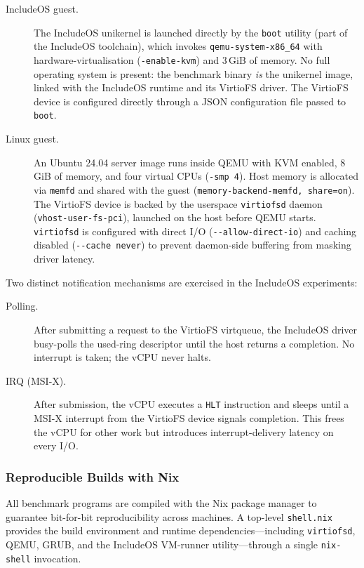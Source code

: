 \begin{description}
  \item[IncludeOS guest.]  The IncludeOS unikernel is launched directly
    by the \texttt{boot} utility (part of the IncludeOS toolchain), which
    invokes \texttt{qemu-system-x86\_64} with hardware-virtualisation
    (\texttt{-enable-kvm}) and 3\,GiB of memory.  No full operating
    system is present: the benchmark binary \emph{is} the unikernel image,
    linked with the IncludeOS runtime and its VirtioFS driver.  The
    VirtioFS device is configured directly through a JSON configuration
    file passed to \texttt{boot}.

  \item[Linux guest.]  An Ubuntu 24.04 server image runs inside QEMU with
    KVM enabled, 8\,GiB of memory, and four virtual CPUs (\texttt{-smp 4}).
    Host memory is allocated via \texttt{memfd} and shared with the guest
    (\texttt{memory-backend-memfd, share=on}).  The VirtioFS device is
    backed by the userspace \texttt{virtiofsd} daemon
    (\texttt{vhost-user-fs-pci}), launched on the host before QEMU starts.
    \texttt{virtiofsd} is configured with direct I/O
    (\texttt{-{}-allow-direct-io}) and caching disabled
    (\texttt{-{}-cache never}) to prevent daemon-side buffering from
    masking driver latency.
\end{description}

Two distinct notification mechanisms are exercised in the IncludeOS
experiments:

\begin{description}
  \item[Polling.]  After submitting a request to the VirtioFS virtqueue,
    the IncludeOS driver busy-polls the used-ring descriptor until the
    host returns a completion.  No interrupt is taken; the vCPU never
    halts.

  \item[IRQ (MSI-X).]  After submission, the vCPU executes a \texttt{HLT}
    instruction and sleeps until a MSI-X interrupt from the VirtioFS
    device signals completion.  This frees the vCPU for other work but
    introduces interrupt-delivery latency on every I/O.
\end{description}

\subsubsection{Reproducible Builds with Nix}

All benchmark programs are compiled with the Nix package manager to
guarantee bit-for-bit reproducibility across machines.  A top-level
\texttt{shell.nix} provides the build environment and runtime
dependencies—including \texttt{virtiofsd}, QEMU, GRUB, and the IncludeOS
VM-runner utility—through a single \texttt{nix-shell} invocation.

